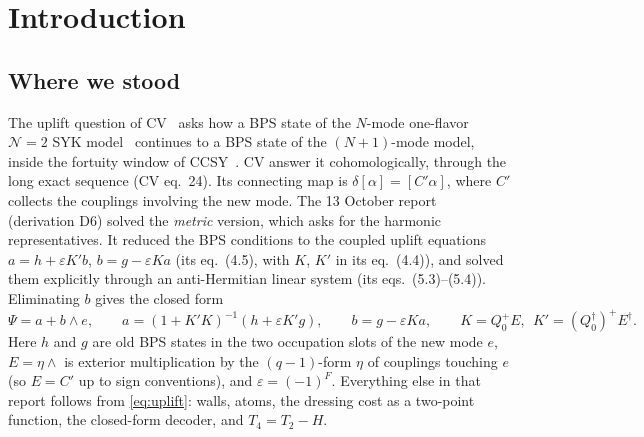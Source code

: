 \documentclass[11pt]{article}
\newcommand{\Np}{N'}
\theoremstyle{plain}
\theoremstyle{remark}
\numberwithin{equation}{section}
\begin{document}
\begin{abstract}
\begin{enumerate}
exactly when $(\Np-q)/2$ is odd. This reproduces KW's Kramers counting. For $q=5$ it predicts exceptional states again
at $\Np=19,23,31,\ldots$, beyond the range KW tested; $\Np=19$ is rigorous for generic couplings.
\item \emph{The window edge resonates.} In chord language the dressing cost is a time-integrated BPS$\to$continuum
two-point function. It decays as $e^{-E_0\tau}\tau^{-3/2}$ in central sectors, as $\tau^{-1/2}$ in resonant ones, and
tends to a plateau, which is the obstruction, at the edge. The chord theory predicts a $K^{-1/2}$ tail for the resonant
dressing costs. The exact data follow it over four decades, with Hill exponent $0.43\to0.48$ and an amplitude within
13--32\% that approaches the chord value as $\Np$ grows, without fitted parameters. The exact uplift keeps the resonance in the dressing cost, but not in the
decoder angles.
\end{enumerate}
\end{abstract}

\tableofcontents

\section{Introduction}\label{sec:intro}

\subsection{Where we stood}
The uplift question of CV~\cite{CV} asks how a BPS state of the $N$-mode one-flavor $\mathcal N=2$ SYK model~\cite{FGMS}
continues to a BPS state of the $(N{+}1)$-mode model, inside the fortuity window of CCSY~\cite{CCSY}. CV answer it cohomologically, through the long exact sequence (CV eq.~24). Its connecting map is
$\delta[\alpha]=[C'\alpha]$, where $C'$ collects the couplings involving the new mode. The 13 October
report~\cite{prog1013} (derivation D6) solved the \emph{metric} version, which asks for the harmonic representatives.
It reduced the BPS conditions to the coupled uplift equations $a=h+\varepsilon K'b$, $b=g-\varepsilon Ka$ (its
eq.~(4.5), with $K$, $K'$ in its eq.~(4.4)), and solved them explicitly through an anti-Hermitian linear system (its
eqs.~(5.3)--(5.4)). Eliminating $b$ gives the closed form
\begin{equation}\label{eq:uplift}
\Psi=a+b\wedge e,\qquad a=(1+K'K)^{-1}(h+\varepsilon K'g),\qquad b=g-\varepsilon Ka,\qquad
K=Q_0^+E,\ \ K'=(Q_0^\dagger)^+E^\dagger .
\end{equation}
Here $h$ and $g$ are old BPS states in the two occupation slots of the new mode $e$, $E=\eta\wedge$ is exterior
multiplication by the $(q-1)$-form $\eta$ of couplings touching $e$ (so $E=C'$ up to sign conventions), and
$\varepsilon=(-1)^F$. Everything else in that report follows from \eqref{eq:uplift}: walls, atoms, the dressing cost as a
two-point function, the closed-form decoder, and $T_4=T_2-H$.
\end{document}

